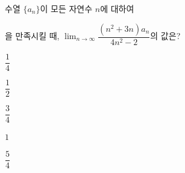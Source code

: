수열 $\{a_n\}$이 모든 자연수 $n$에 대하여 \par\smallskip{}\par\smallskip\noindent 을 만족시킬 때, $\displaystyle\lim_{n\to\infty}\dfrac{(n^2+3n)a_n}{4n^2-2}$의 값은?
\begin{choices32}{\rule[-3ex]{0pt}{8ex}$\dfrac{1}{4}$}{\rule[-3ex]{0pt}{8ex}$\dfrac{1}{2}$}{\rule[-3ex]{0pt}{8ex}$\dfrac{3}{4}$}{\rule[-3ex]{0pt}{8ex}$1$}{\rule[-3ex]{0pt}{8ex}$\dfrac{5}{4}$}\end{choices32}
